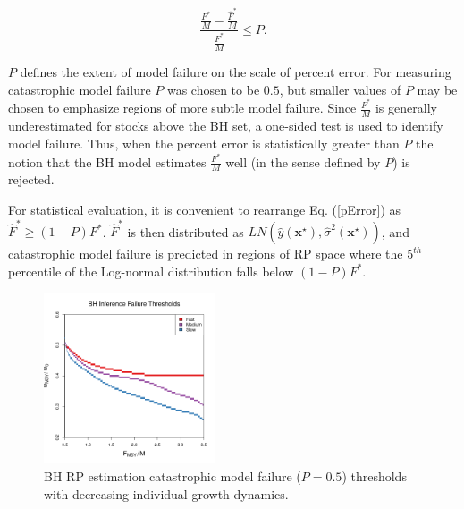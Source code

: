 %
\begin{equation}
\frac{\frac{F^*}{M}-\frac{\hat{F}^*}{M}}{\frac{F^*}{M}}\le P. \label{pError}
\end{equation}

%
$P$ defines the extent of model failure on the scale of percent error. For
measuring catastrophic model failure $P$ was chosen to be $0.5$, but smaller values
of $P$ may be chosen to emphasize regions of more subtle model failure. %
%
Since $\frac{F^*}{M}$ is generally underestimated for stocks above the BH set, a 
one-sided test is used to identify model failure.
Thus, when the percent error is statistically greater than $P$ the notion that
the BH model estimates $\frac{F^*}{M}$ well (in the sense defined by $P$) is rejected.

%
For statistical evaluation, it is convenient to rearrange Eq. (\ref{pError})
as \mbox{$\hat{F}^*\ge (1-P)F^*$}. $\hat{F}^*$ is then distributed as $LN(\hat y(\textbf{x}^\star), \hat \sigma^2(\textbf{x}^\star))$,
and catastrophic model failure is predicted
in regions of RP space where the $5^{th}$ percentile of the 
Log-normal distribution falls below \mbox{$(1-P)F^*$.}

\begin{figure}
\includegraphics[width=0.45\textwidth]{../ddBias/relErrorImagesBHDD0.5.png}
\vspace{-0.5cm}
\caption{BH RP estimation catastrophic model failure ($P=0.5$) thresholds with decreasing individual growth dynamics.
}\label{breaks}
\end{figure}

